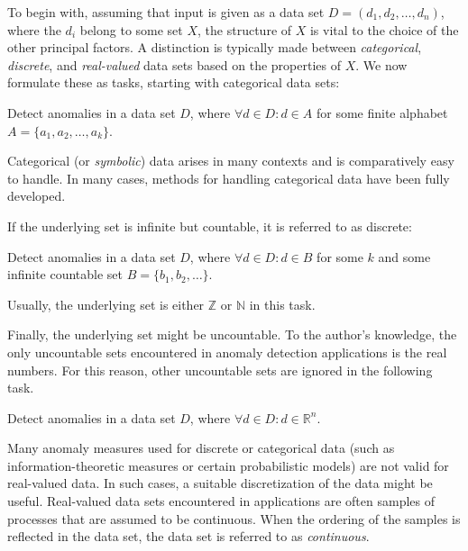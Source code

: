 To begin with, assuming that input is given as a data set $D = (d_1, d_2, \dots, d_n)$, where the $d_i$ belong to some set $X$, the structure of $X$ is vital to the choice of the other principal factors. A distinction is typically made between \emph{categorical}, \emph{discrete}, and \emph{real-valued} data sets based on the properties of $X$. We now formulate these as tasks, starting with categorical data sets:

\begin{task}
  Detect anomalies in a data set $D$, where $\forall d \in D: d \in A$ for some finite alphabet $A = \{a_1, a_2, \dots, a_k\}$.
\end{task}

Categorical (or \emph{symbolic}) data arises in many contexts and is comparatively easy to handle. In many cases, methods for handling categorical data have been fully developed.

If the underlying set is infinite but countable, it is referred to as discrete:

\begin{task}
  Detect anomalies in a data set $D$, where $\forall d \in D: d \in B$ for some $k$ and some infinite countable set $B = \{b_1, b_2, \dots\}$.
\end{task}

Usually, the underlying set is either $\mathbb{Z}$ or $\mathbb{N}$ in this task.

Finally, the underlying set might be uncountable. To the author's knowledge, the only uncountable sets encountered in anomaly detection applications is the real numbers. For this reason, other uncountable sets are ignored in the following task.

\begin{task}
  Detect anomalies in a data set $D$, where $\forall d \in D: d \in \mathbb{R}^n$.
\end{task}

Many anomaly measures used for discrete or categorical data (such as information-theoretic measures or certain probabilistic models) are not valid for real-valued data. In such cases, a suitable discretization of the data might be useful. Real-valued data sets encountered in applications are often samples of processes that are assumed to be continuous. When the ordering of the samples is reflected in the data set, the data set is referred to as \emph{continuous}.


